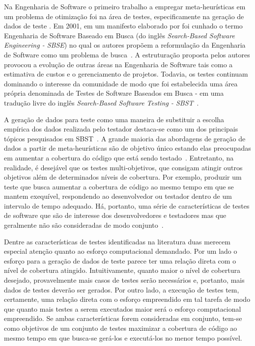 Na Engenharia de Software o primeiro trabalho a empregar meta-heurísticas em um problema de otimização foi na área de testes, especificamente na geração de dados de teste \cite{miller1976automatic}. Em 2001, em um manifesto elaborado por  foi cunhado o termo Engenharia de Software Baseado em Busca (do inglês \textit{Search-Based Software Engineering - SBSE}) no qual os autores propõem a reformulação da Engenharia de Software como um problema de busca~\cite{harman2001search}. A estruturação proposta pelos autores provocou a evolução de outras áreas na Engenharia de Software tais como a estimativa de custos e o gerenciamento de projetos. Todavia, os testes continuam dominando o interesse da comunidade de modo que foi estabelecida  uma área própria denominada de Testes de Software Baseados em Busca - em uma tradução livre do inglês \textit{Search-Based Software Testing - SBST}~\cite{harman2012search}.

A geração de dados para teste como uma maneira de substituir a escolha empírica dos dados realizada pelo testador destaca-se como um dos principais tópicos pesquisados em SBST~\cite{mcminn2004search}. A grande maioria das abordagens de geração de dados a partir de meta-heurísticas são de objetivo único estando elas preocupadas em aumentar a cobertura do código que está sendo testado~\cite{harman2015achievements}. Entretanto, na realidade, é desejável que os testes multi-objetivos, que consigam atingir outros objetivos além de determinados níveis de cobertura. Por exemplo, produzir um teste que busca aumentar a cobertura de código ao mesmo tempo em que se mantem exequível, respondendo ao desenvolvedor ou testador dentro de um intervalo de tempo adequado. Há, portanto, uma série de características de testes de software que são de interesse dos desenvolvedores e testadores mas que geralmente não são consideradas de modo conjunto~\cite{harman2015achievements}.

Dentre as características de testes identificadas na literatura duas merecem especial atenção quanto ao esforço computacional demandado. Por um lado o esforço para a geração de dados de teste parece ter uma relação direta com o nível de cobertura atingido. Intuitivamente, quanto maior o nível de cobertura desejado, provavelmente mais casos de testes serão necessários e, portanto, mais dados de testes deverão ser gerados. Por outro lado, a execução de testes tem, certamente, uma relação direta com o esforço empreendido em tal tarefa de modo que quanto mais testes a serem executados maior será o esforço computacional empreendido.  Se ambas características forem consideradas em conjunto, tem-se como objetivos de um conjunto de testes maximizar a cobertura de código  ao mesmo tempo em que busca-se gerá-los e executá-los no menor tempo possível.

